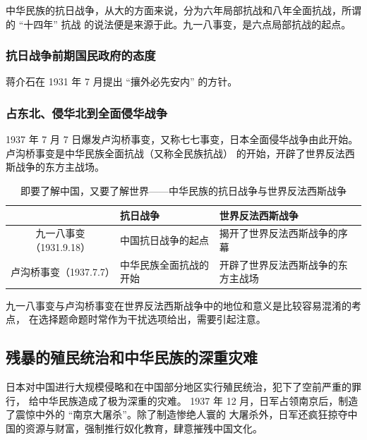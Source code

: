 \documentclass[10pt, UTF8]{book} %
\begin{document}
\begin{remark}
    中华民族的抗日战争，从大的方面来说，分为六年局部抗战和八年全面抗战，所谓的 “十四年” 抗战
    的说法便是来源于此。九一八事变，是六点局部抗战的起点。
\end{remark}

\subsubsection{抗日战争前期国民政府的态度}

蒋介石在 1931 年 7 月提出 “攘外必先安内” 的方针。

\subsubsection{占东北、侵华北到全面侵华战争}

1937 年 7 月 7 日爆发卢沟桥事变，又称七七事变，日本全面侵华战争由此开始。卢沟桥事变是中华民族全面抗战（又称全民族抗战）
的开始，开辟了世界反法西斯战争的东方主战场。

\begin{table}[H]
    \centering
    \caption{即要了解中国，又要了解世界——中华民族的抗日战争与世界反法西斯战争}
    \begin{tabular}{c|p{}p{}}
        \hline
        & \textbf{抗日战争} & \textbf{世界反法西斯战争} \\
        \hline 
        九一八事变（1931.9.18） & 中国抗日战争的起点 & 揭开了世界反法西斯战争的序幕 \\ 
        \hline 
        卢沟桥事变（1937.7.7） & 中华民族全面抗战的开始 & 开辟了世界反法西斯战争的东方主战场 \\ 
        \hline 
    \end{tabular}
\end{table}
\begin{remark}
    九一八事变与卢沟桥事变在世界反法西斯战争中的地位和意义是比较容易混淆的考点，
    在选择题命题时常作为干扰选项给出，需要引起注意。
\end{remark}

\subsection{残暴的殖民统治和中华民族的深重灾难}

日本对中国进行大规模侵略和在中国部分地区实行殖民统治，犯下了空前严重的罪行，
给中华民族造成了极为深重的灾难。
1937 年 12 月，日军占领南京后，制造了震惊中外的 “南京大屠杀”。除了制造惨绝人寰的
大屠杀外，日军还疯狂掠夺中国的资源与财富，强制推行奴化教育，肆意摧残中国文化。
\end{document}
